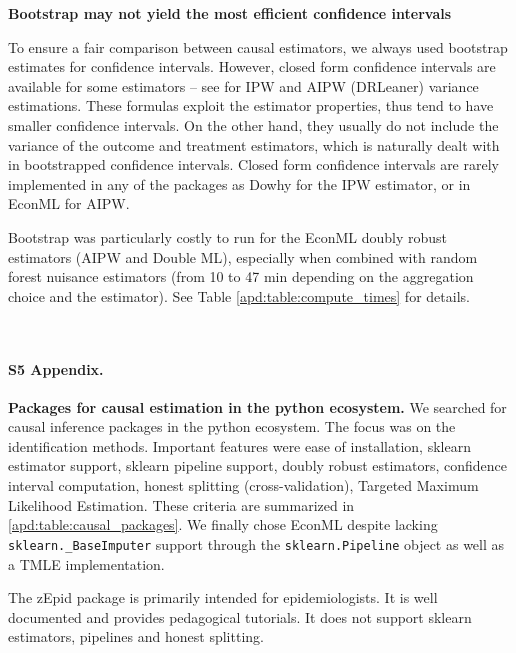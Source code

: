 \documentclass[10pt,letterpaper]{article}
\begin{document}
\textbf{Bootstrap may not yield the most efficient confidence intervals}

To ensure a fair comparison between causal estimators, we always used
bootstrap estimates for confidence intervals. However, closed form
confidence intervals are available for some estimators -- see \cite{wager2020stats}
for IPW and AIPW (DRLeaner) variance estimations. These formulas exploit the
estimator properties, thus tend to have smaller confidence intervals. On the
other hand, they usually do not include the variance of the outcome and
treatment estimators, which is naturally dealt with in bootstrapped confidence
intervals. Closed form confidence intervals are rarely implemented in any of the
packages as Dowhy for the IPW estimator, or in EconML for AIPW.

Bootstrap was particularly costly to run for the EconML doubly robust
estimators (AIPW and Double ML), especially when combined with random forest nuisance
estimators (from 10 to 47 min depending on the aggregation choice and the
estimator). See Table \ref{apd:table:compute_times} for details.

\begin{table}[]
  \centering\small
  
  \\
  \caption{Compute times for the different estimation methods with 50 bootstrap replicates.}\label{apd:table:compute_times}
\end{table}



\paragraph*{S5 Appendix.}
\label{apd:packages}
{\bf Packages for causal estimation in the python ecosystem.}
We searched for causal inference packages in the python ecosystem. The focus
was on the identification methods. Important features were ease of
installation, sklearn estimator support, sklearn pipeline support, doubly
robust estimators, confidence interval computation, honest splitting
(cross-validation), Targeted Maximum Likelihood Estimation. These criteria are
summarized in \ref{apd:table:causal_packages}. We finally chose EconML despite
lacking \texttt{sklearn.\_BaseImputer} support through the
\texttt{sklearn.Pipeline} object as well as a TMLE implementation.

The zEpid package is primarily intended for epidemiologists. It is well documented
and provides pedagogical tutorials. It does not support sklearn estimators,
pipelines and honest splitting.
\end{document}
